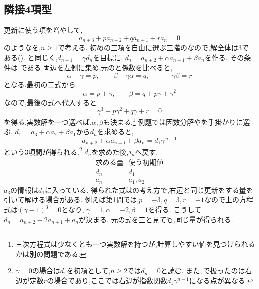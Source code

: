 \subsection{隣接4項型}\label{節：隣接4項間漸化式型}
更新に使う項を増やして,
\[
  a_{n+3}+pa_{n+2}+qa_{n+1}+ra_n=0
\]
のようなを,$n\ge1$で考える.
初めの三項を自由に選ぶ三階のなので,解全体は3である().
と同じく,$d_{n+1}=\gamma d_n$を目標に,
$d_n=a_{n+2}+\alpha a_{n+1}+\beta a_n$を作る.
その条件は
\BookMathLayout{\[
  a_{n+3}+\alpha a_{n+2}+\beta a_{n+1}=\gamma \left(a_{n+2}+\alpha a_{n+1}+\beta a_{n}\right)
\]}{
\[
\begin{aligned}
a_{n+3}+\alpha a_{n+2}+\beta a_{n+1}\\
{}=\gamma\left(a_{n+2}+\alpha a_{n+1}+\beta a_n\right)
\end{aligned}
\]
}
である.両辺を左側に集め,元のと係数を比べると,
\[
  \alpha-\gamma=p,\qquad
  \beta-\gamma\alpha=q,\qquad
  -\gamma\beta=r
\]
となる.最初の二式から
\[
  \alpha=p+\gamma,\qquad
  \beta=q+p\gamma+\gamma^2
\]
なので,最後の式へ代入すると
\[
  \gamma^3+p\gamma^2+q\gamma+r=0
\]
を得る.実数解を一つ選べば,$\alpha,\beta$も決まる.\footnote{三次方程式は少なくとも一つ実数解を持つが,計算しやすい値を見つけられるかは別の問題である.}
例題では因数分解やを手掛かりに選ぶ.
$d_1=a_3+\alpha a_2+\beta a_1$から$d_n$を求めると,
\[
  a_{n+2}+\alpha a_{n+1}+\beta a_n=d_1\gamma^{\,n-1}
\]
という3項間が得られる.\footnote{$\gamma=0$の場合は$d_1$を初項として,$n\ge2$では$d_n=0$と読む.
また,\,で扱ったのは右辺が定数$r$の場合であり,ここでは右辺が指数関数$d_1\gamma^{n-1}$になる点が異なる.}
$d_n$を求めた後,$a_n$へ戻す.
\[
  \begin{array}{c|c}
    \text{求める量}&\text{使う初期値}\\ \hline
    d_n&d_1\\
    a_n&a_1,a_2
  \end{array}
\]
$a_3$の情報は$d_1$に入っている.
得られた式はの考え方で,右辺と同じ更新をする量を引いて解ける場合がある.
例えば第1問では,$p=-3,q=3,r=-1$なので上の方程式は$(\gamma-1)^3=0$となり,
$\gamma=1,\alpha=-2,\beta=1$を得る.
こうして$d_n=a_{n+2}-2a_{n+1}+a_n$が決まる.
元の式を\mbox{三}と見ても,同じ量が得られる.

